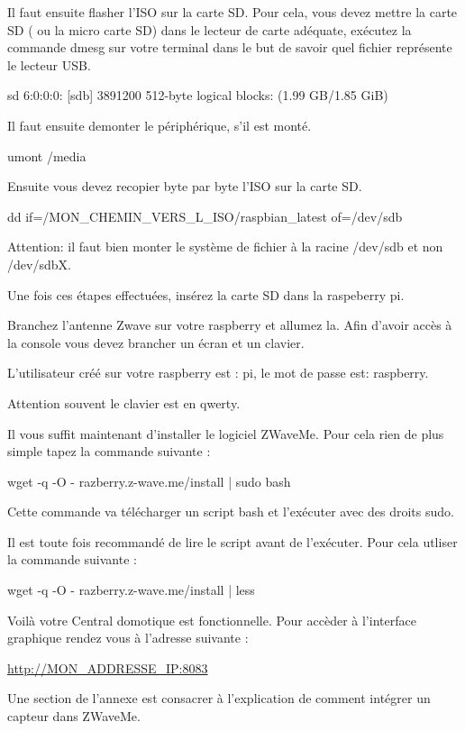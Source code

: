 Il faut ensuite flasher l'ISO sur la carte SD. Pour cela, vous devez mettre la carte SD ( ou la micro carte SD) dans le lecteur de carte adéquate, exécutez la commande dmesg sur votre terminal dans le but de savoir quel fichier représente le lecteur USB.


\begin{terminal}
 [91588.698451] sd 6:0:0:0: [sdb] 3891200 512-byte logical blocks: (1.99 GB/1.85 GiB)
\end{terminal}

Il faut ensuite demonter le périphérique, s'il est monté.

\begin{terminal}
 umont /media
\end{terminal}


Ensuite vous devez recopier byte par byte l'ISO sur la carte SD.

\begin{terminal}
 dd if=/MON\_CHEMIN\_VERS\_L\_ISO/raspbian\_latest of=/dev/sdb
\end{terminal}

Attention: il faut bien monter le système de fichier à la racine /dev/sdb et non /dev/sdbX.

Une fois ces étapes effectuées, insérez la carte SD dans la raspeberry pi.

Branchez l'antenne Zwave sur votre raspberry et allumez la.
Afin d'avoir accès à la console vous devez brancher un écran et un clavier. 

L'utilisateur créé sur votre raspberry est : pi,
le mot de passe est: raspberry. 

Attention souvent le clavier est en qwerty.

Il vous suffit maintenant d'installer le logiciel ZWaveMe. Pour cela rien de plus simple tapez la commande suivante : 



\begin{terminal}
 wget -q -O - razberry.z-wave.me/install | sudo bash
\end{terminal}

Cette commande va télécharger un script bash et l'exécuter avec des droits sudo.

Il est toute fois recommandé de lire le script avant de l'exécuter. Pour cela utliser la commande suivante :

\begin{terminal}
 wget -q -O - razberry.z-wave.me/install | less
\end{terminal}

Voilà votre Central domotique est fonctionnelle. Pour accèder à l'interface graphique rendez vous à l'adresse suivante  :

\url{http://MON\_ADDRESSE\_IP:8083}


Une section de l'annexe est consacrer à l'explication de comment intégrer un capteur dans ZWaveMe.
